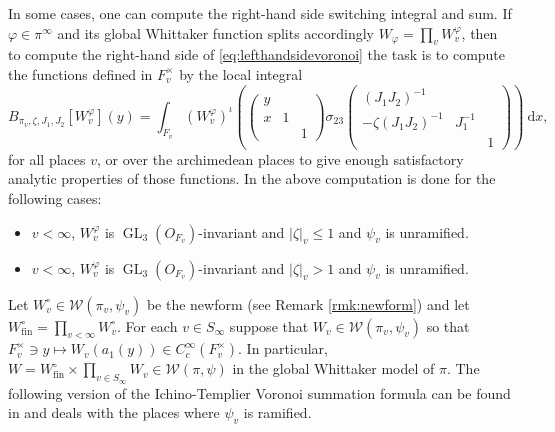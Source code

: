 \documentclass[a4paper,11pt]{amsart}
\theoremstyle{definition}
\newcommand{\gelle}{\operatorname{GL}}
\newcommand{\fin}{\text{fin}}
\begin{document}
In some cases, one can compute the right-hand side switching integral and sum. If $\varphi \in \pi^{\infty}$ and its global Whittaker function splits accordingly $W_{\varphi} = \prod_{v}W_v^{\varphi}$, then to compute the right-hand side of \eqref{eq:lefthandsidevoronoi} the task is to compute the functions defined in $F_v^{\times}$ by the local integral 
\begin{equation*}
   B_{\pi_v,\zeta,J_1,J_2}[W_v^{\varphi}](y)= \int_{F_v}({W_{v}^{\varphi}})^{\iota}\left(\begin{pmatrix}
        y&&\\x&1\\&&1
    \end{pmatrix}\sigma_{23}\begin{pmatrix}
        (J_1J_2)^{-1}&&\\-\zeta (J_1J_2)^{-1}&J_1^{-1}&\\&&1
    \end{pmatrix}\right) \ \mathrm{d}x,
\end{equation*}
for all places $v$, or over the archimedean places to give enough satisfactory analytic properties of those functions.
In \cite{IchinoTemplier} the above computation is done for the following cases: \begin{itemize}
    \item $v<\infty$, $W_v^{\varphi}$ is $\gelle_3(O_{F_v})$-invariant and $\vert{\zeta}\vert_v \leq 1$ and $\psi_v$ is unramified.
    \item $v< \infty$, $W_v^{\varphi}$ is $\gelle_3(O_{F_v})$-invariant and $\vert{\zeta}\vert_v >1$ and $\psi_v$ is unramified.  
\end{itemize}



 Let $W_v^{\circ}\in \mathcal{W}(\pi_v,\psi_v)$ be the newform (see Remark \ref{rmk:newform}) and let $W^{\circ}_{\fin}=\prod_{v<\infty}W^{\circ}_v$. For each $v\in S_{\infty}$ suppose that $W_v \in \mathcal{W}(\pi_v,\psi_v)$ so that $F_v^{\times}\ni y \mapsto W_v(a_1(y)) \in C_c^{\infty}(F_v^{\times})$. In particular, $W = W_{\fin}^{\circ} \times \prod_{v\in S_{\infty}}W_v \in \mathcal{W}(\pi,\psi)$ in the global Whittaker model of $\pi$. 
 The following version of the Ichino-Templier Voronoi summation formula can be found in \cite[Proposition 4.2]{Qi2024} and deals with the places where $\psi_v$ is ramified.
\end{document}
